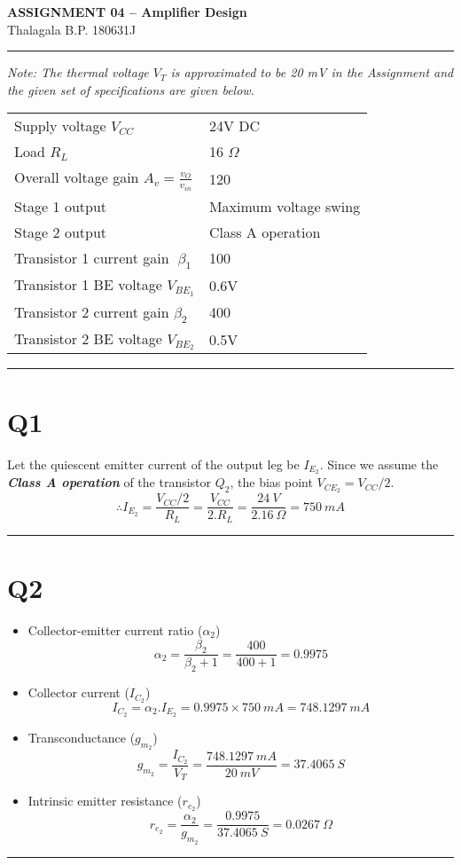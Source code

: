 \documentclass[legalpaper,11pt]{article}%
\begin{document}
	\begin{center}
		{\large \textbf{ASSIGNMENT 04 – Amplifier Design}}\\
		Thalagala B.P.\hspace{0.5cm} 180631J
	\end{center}
	\hrule

\vspace{5mm}
\textit{Note: The thermal voltage $V_T$ is approximated to be 20 mV in the Assignment and the given set of specifications are given below. }\\

\begin{center}
	\begin{tabular}{l l}
Supply voltage $V_{CC}$ &24V DC\\
Load $R_L$& 16 $\Omega$\\
Overall voltage gain $A_v = \frac{v_O}{v_{in}}$ &120\\
Stage 1 output & Maximum voltage swing\\
Stage 2 output &Class A operation\\
Transistor 1 current gain $\beta_1$ &100\\
Transistor 1 BE voltage $V_{BE_1}$& 0.6V\\
Transistor 2 current gain $\beta_2$& 400\\
Transistor 2 BE voltage $V_{BE_2}$& 0.5V	\\
\end{tabular}
\end{center}
\hrule

\section*{Q1}
Let the quiescent emitter current of the output leg be $I_{E_2}$. Since we assume the \textbf{\textit{Class A operation}} of the transistor $Q_2$, the bias point $V_{CE_2} = V_{CC}/2$. 
\[\therefore I_{E_2} = \frac{ V_{CC}/2}{R_L} = \frac{V_{CC}}{2.R_L} =\frac{24~V}{2.16~ \Omega} = 750~mA
\]
\hrule
\section*{Q2}
\begin{itemize}
	\item Collector-emitter current ratio ($\alpha_2$)
	\[ \alpha_2 = \frac{\beta_2}{\beta_2+1} = \frac{400}{400+1} = 0.9975  \]
	
	\item Collector current ($I_{C_2}$)
	\[ I_{C_2} = \alpha_2.I_{E_2} = 0.9975\times750~mA = 748.1297 ~mA\]
	
	\item Transconductance ($g_{m_2}$)
	\[ g_{m_2} = \frac{I_{C_2}}{V_T} = \frac{748.1297 ~mA}{20~mV} = 37.4065~ S\]
	
	\item Intrinsic emitter resistance ($r_{e_2}$)
	\[ r_{e_2} = \frac{\alpha_2}{g_{m_2}} = \frac{0.9975}{37.4065 ~S} = 0.0267 ~\Omega \]
\end{itemize}
\hrule
\end{document}
